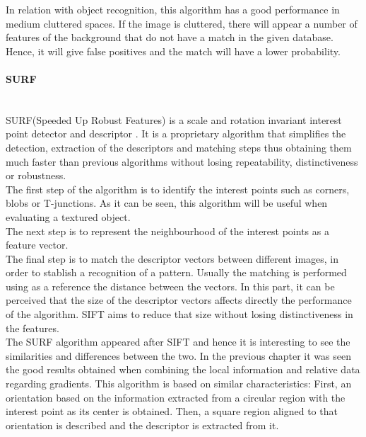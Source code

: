 In relation with object recognition, this algorithm has a good performance in medium cluttered spaces. If the image is cluttered, there will appear a number of features of the background that do not have a match in the given database. Hence, it will give false positives and the match will have a lower probability. 




\paragraph{SURF}\mbox{}\\

SURF(Speeded Up Robust Features) is a scale and rotation invariant interest point detector and descriptor \cite{surf}. 
It is a proprietary algorithm that simplifies the detection, extraction of the descriptors and matching steps thus obtaining them much faster than previous algorithms without losing repeatability, distinctiveness or robustness. 
\\

The first step of the algorithm is to identify the interest points such as corners, blobs or T-junctions. As it can be seen, this algorithm will be useful when evaluating a textured object. 
\\

The next step is to represent the neighbourhood of the interest points as a feature vector. 
\\

The final step is to match the descriptor vectors between different images, in order to stablish a recognition of a pattern. Usually the matching is performed using as a reference the distance between the vectors. 
In this part, it can be perceived that the size of the descriptor vectors affects directly the performance of the algorithm. SIFT aims to reduce that size without losing distinctiveness in the features. 
\\

The SURF algorithm appeared after SIFT and hence it is interesting to see the similarities and differences between the two. In the previous chapter it was seen the good results obtained when combining the local information and relative data regarding gradients. This algorithm is based on similar characteristics: 
First, an orientation based on the information extracted from a circular region with the interest point as its center is obtained. Then, a square region aligned to that orientation is described and the descriptor is extracted from it.  
\\

